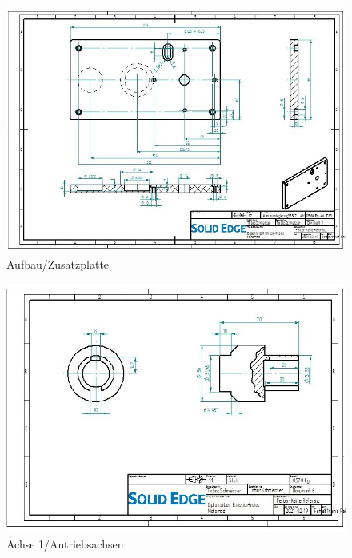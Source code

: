\begin{figure} [H]
	\begin{center}
		\includegraphics[angle=90]{figures/mechanik/Aufbau_Seitenplatte_Links_Zeichn.jpg}
			\caption{Aufbau/Zusatzplatte}
			\label{fig:Aufbau/Zusatzplatte}
	\end{center}
\end{figure}


\begin{figure} [H]
	\begin{center}
		\includegraphics[angle=90]{figures/mechanik/Antriebsachse_Zeichnung.jpg}
			\caption{Achse 1/Antriebsachsen}
			\label{fig:Achse 1/Antriebsachsen}
	\end{center}
\end{figure}


